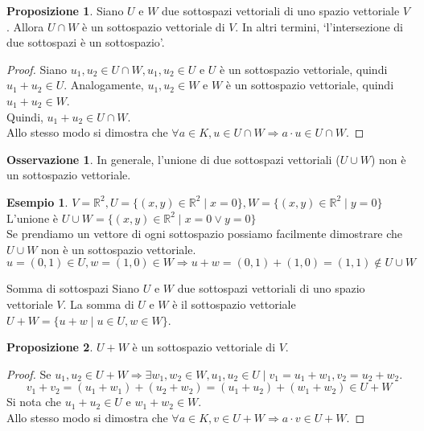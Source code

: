 \documentclass[a4paper]{article}
\theoremstyle{definition}
\newtheorem*{oss}{Osservazione}
\newtheorem*{es}{Esempio}
\newtheorem*{prop}{Proposizione}
\begin{document}
\begin{prop}
	Siano $U$ e $W$ due sottospazi vettoriali di uno spazio vettoriale $V$. Allora $U \cap W$ è un sottospazio vettoriale di $V$.
	In altri termini, \enquote*{l'intersezione di due sottospazi è un sottospazio}.
\end{prop}

\begin{proof}
	Siano $u_1, u_2 \in U \cap W, u_1, u_2 \in U$ e $U$ è un sottospazio vettoriale, quindi $u_1 + u_2 \in U$.
	Analogamente, $u_1, u_2 \in W$ e $W$ è un sottospazio vettoriale, quindi $u_1 + u_2 \in W$. \\
	Quindi, $u_1 + u_2 \in U \cap W$. \\
	Allo stesso modo si dimostra che $\forall a \in K, u \in U \cap W \Rightarrow a \cdot u \in U \cap W$.
\end{proof}

\begin{oss}
	In generale, l'unione di due sottospazi vettoriali ($U \cup W$) non è un sottospazio vettoriale.
\end{oss}
\begin{es}
	$V = \mathbb{R}^2, U = \{(x, y) \in \mathbb{R}^2 \mid x = 0\}, W = \{(x, y) \in \mathbb{R}^2 \mid y = 0\}$ \\
	L'unione è $U \cup W = \{(x, y) \in \mathbb{R}^2 \mid x = 0 \lor y = 0\}$ \\
	Se prendiamo un vettore di ogni sottospazio possiamo facilmente dimostrare che $U \cup W$ non è un sottospazio vettoriale.
	\[ u = (0, 1) \in U, w = (1, 0) \in W \Rightarrow u + w = (0, 1) + (1, 0) = (1, 1) \notin U \cup W \]
\end{es}

\begin{deff}{Somma di sottospazi}{}
	Siano $U$ e $W$ due sottospazi vettoriali di uno spazio vettoriale $V$.
	La somma di $U$ e $W$ è il sottospazio vettoriale $U + W = \{u + w \mid u \in U, w \in W\}$.
\end{deff}
\begin{prop}
	$U + W$ è un sottospazio vettoriale di $V$.
\end{prop}
\begin{proof}
	Se $u_1, u_2 \in U + W \Rightarrow \exists w_1, w_2 \in W, u_1, u_2 \in U \mid v_1 = u_1 + w_1, v_2 = u_2 + w_2$.
	\[ v_1 + v_2 = (u_1 + w_1) + (u_2 + w_2) = (u_1 + u_2) + (w_1 + w_2) \in U + W \]
	Si nota che $u_1 + u_2 \in U$ e $w_1 + w_2 \in W$. \\
	Allo stesso modo si dimostra che $\forall a \in K, v \in U + W \Rightarrow a \cdot v \in U + W$.
\end{proof}
\end{document}
